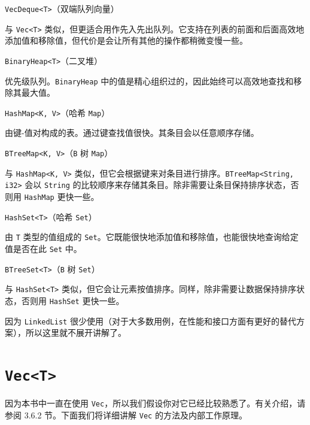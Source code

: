 \begin{mySidenote}
\texttt{VecDeque<T>}（双端队列向量）
\end{mySidenote}

与 \texttt{Vec<T>} 类似，但更适合用作先入先出队列。它支持在列表的前面和后面高效地添加值和移除值，但代价是会让所有其他的操作都稍微变慢一些。

\begin{mySidenote}
\texttt{BinaryHeap<T>}（二叉堆）
\end{mySidenote}

优先级队列。\texttt{BinaryHeap} 中的值是精心组织过的，因此始终可以高效地查找和移除其最大值。

\begin{mySidenote}
\texttt{HashMap<K, V>}（哈希 \texttt{Map}）
\end{mySidenote}

由键-值对构成的表。通过键查找值很快。其条目会以任意顺序存储。

\begin{mySidenote}
\texttt{BTreeMap<K, V>}（\texttt{B} 树 \texttt{Map}）
\end{mySidenote}

与 \texttt{HashMap<K, V>} 类似，但它会根据键来对条目进行排序。\texttt{BTreeMap<String, i32>} 会以 \texttt{String} 的比较顺序来存储其条目。除非需要让条目保持排序状态，否则用 \texttt{HashMap} 更快一些。

\begin{mySidenote}
\texttt{HashSet<T>}（哈希 \texttt{Set}）
\end{mySidenote}

由 \texttt{T} 类型的值组成的 \texttt{Set}。它既能很快地添加值和移除值，也能很快地查询给定值是否在此 \texttt{Set} 中。

\begin{mySidenote}
\texttt{BTreeSet<T>}（\texttt{B} 树 \texttt{Set}）
\end{mySidenote}

与 \texttt{HashSet<T>} 类似，但它会让元素按值排序。同样，除非需要让数据保持排序状态，否则用 \texttt{HashSet} 更快一些。

因为 \texttt{LinkedList} 很少使用（对于大多数用例，在性能和接口方面有更好的替代方案），所以这里就不展开讲解了。

\section{\texttt{Vec<T>}}

因为本书中一直在使用 \texttt{Vec}，所以我们假设你对它已经比较熟悉了。有关介绍，请参阅 3.6.2 节。下面我们将详细讲解 \texttt{Vec} 的方法及内部工作原理。


